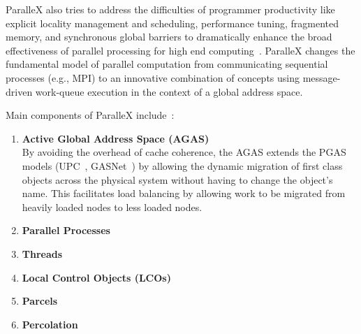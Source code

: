 ParalleX also tries to address the difficulties of programmer productivity like explicit locality management and scheduling, performance tuning, fragmented memory, and synchronous global barriers to dramatically enhance the broad effectiveness of parallel processing for high end computing~\cite{4228212}. ParalleX changes the fundamental model of parallel computation from communicating sequential processes (e.g., MPI) to an innovative combination of concepts using message-driven work-queue execution in the context of a global address space.~\cite{tabbal2011preliminary,sterling2014towards}

Main components of ParalleX include~\cite{kaiser2009parallex,dekate2012improving}:
\begin{enumerate}
\item \textbf{Active Global Address Space (AGAS)}\\
  By avoiding the overhead of cache coherence, the AGAS extends the PGAS~\cite{stitt2009introduction} models (UPC~\cite{}, GASNet~\cite{bonachea2002gasnet}) by allowing the dynamic migration of first class objects across the physical system without having to change the object's name. This facilitates load balancing by allowing work to be migrated from heavily loaded nodes to less loaded nodes.  
\item \textbf{Parallel Processes}
\item \textbf{Threads}
\item \textbf{Local Control Objects (LCOs)}
\item \textbf{Parcels}
\item \textbf{Percolation}
  
\end{enumerate}

